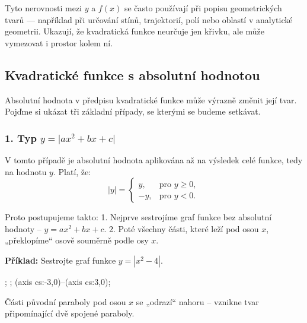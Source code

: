 \documentclass[12pt,a4paper]{article}
\begin{document}
\begin{notebox}
Tyto nerovnosti mezi \(y\) a \(f(x)\) se často používají při popisu geometrických tvarů — například při určování stínů, trajektorií, polí nebo oblastí v analytické geometrii.  
Ukazují, že kvadratická funkce neurčuje jen křivku, ale může vymezovat i prostor kolem ní.
\end{notebox}


\subsection{Kvadratické funkce s absolutní hodnotou}

Absolutní hodnota v předpisu kvadratické funkce může výrazně změnit její tvar.  
Pojďme si ukázat tři základní případy, se kterými se budeme setkávat.


\subsubsection*{1. Typ \(\displaystyle y = \lvert ax^2 + bx + c\rvert\)}

V tomto případě je absolutní hodnota aplikována až na výsledek celé funkce, tedy na hodnotu \(y\).  
Platí, že:
\[
|y| =
\begin{cases}
y, & \text{pro } y \ge 0,\\
-y, & \text{pro } y < 0.
\end{cases}
\]

Proto postupujeme takto:
1. Nejprve sestrojíme graf funkce bez absolutní hodnoty – \(y = ax^2 + bx + c\).
2. Poté všechny části, které leží pod osou \(x\), „překlopíme“ osově souměrně podle osy \(x\).

\begin{examplebox}
\textbf{Příklad:}  
Sestrojte graf funkce \(y = |x^2 - 4|\).

\begin{center}
\begin{axisgraph}[
  xmin=-3, xmax=3,
  ymin=-1, ymax=5,
  samples=200,
  width=9cm,
  height=6cm,
  title={$y = |x^2 - 4|$}
]
  ;
  ;
   (axis cs:-3,0)--(axis cs:3,0);
\end{axisgraph}
\end{center}

Části původní paraboly pod osou \(x\) se „odrazí“ nahoru – vznikne tvar připomínající dvě spojené paraboly.
\end{examplebox}
\end{document}
